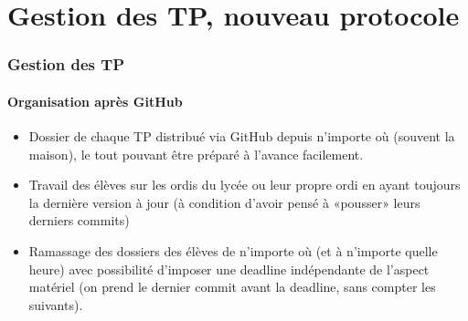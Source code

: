 \section{Gestion des TP, nouveau protocole}

\begin{frame}
	\frametitle{Gestion des TP}
	\framesubtitle{Organisation après GitHub}

	\begin{itemize}[<+->]
		\item	 Dossier de chaque TP distribué via GitHub depuis n'importe où (souvent la maison), le tout pouvant être préparé à l'avance facilement.

		\item  Travail des élèves sur les ordis du lycée ou leur propre ordi en ayant toujours la dernière version à jour (à condition d'avoir pensé à «pousser» leurs derniers commits)

		\item Ramassage des dossiers des élèves de n'importe où (et à n'importe quelle heure) avec possibilité d'imposer une deadline indépendante de l'aspect matériel (on prend le dernier commit avant la deadline, sans compter les suivants).


	\end{itemize}

\end{frame}


